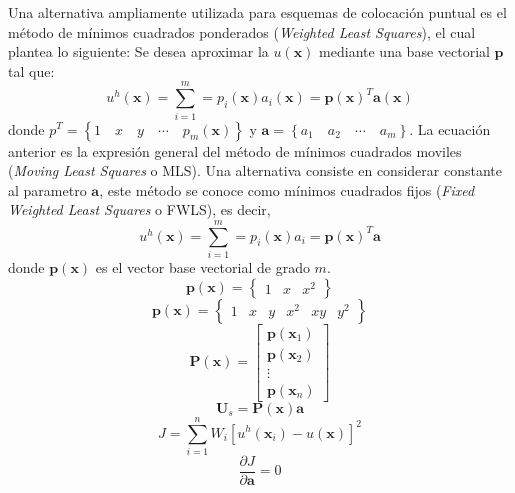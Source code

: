 Una alternativa ampliamente utilizada para esquemas de colocación puntual es el método de mínimos cuadrados ponderados (\textit{Weighted Least Squares}), el cual plantea lo siguiente: Se desea aproximar la $u(\bm{x})$ mediante una base vectorial $\bm{p}$ tal que:
\begin{equation}
    u^h(\bm{x}) = \sum_{i=1}^m = p_i(\bm{x}) a_i(\bm{x}) = \bm{p}(\bm{x})^T \bm{a}(\bm{x})
\end{equation}
donde $p^T = \left\{ 1 \quad x \quad y \quad \cdots \quad p_m(\bm{x})\right\}$ y $\bm{a} = \left\{ a_1 \quad a_2 \quad \cdots \quad a_m\right\}$. La ecuación anterior es la expresión general del método de mínimos cuadrados moviles (\textit{Moving Least Squares} o MLS). Una alternativa consiste en considerar constante al parametro $\bm{a}$, este método se conoce como mínimos cuadrados fijos (\textit{Fixed Weighted Least Squares} o FWLS), es decir,
\begin{equation}
    u^h(\bm{x}) = \sum_{i=1}^m = p_i(\bm{x}) a_i = \bm{p}(\bm{x})^T \bm{a}
\end{equation}
donde $\bm{p}(\bm{x})$ es el vector base vectorial de grado $m$.
\begin{equation}
    \bm{p}(\bm{x}) = \begin{Bmatrix} 1 & x & x^2 \end{Bmatrix}
\end{equation}
\begin{equation}
    \bm{p}(\bm{x}) = \begin{Bmatrix} 1 & x & y & x^2 & xy & y^2\end{Bmatrix}
\end{equation}
\begin{equation}
    \bm{P}(\bm{x})  = \begin{bmatrix} \bm{p}(\bm{x}_1) \\ \bm{p}(\bm{x}_2) \\ \vdots \\ \bm{p}(\bm{x}_n) \end{bmatrix}
\end{equation}
\begin{equation}
    \bm{U}_s = \bm{P}(\bm{x}) \bm{a}
\end{equation}
\begin{equation}
    J = \sum_{i=1}^n W_i \left[ u^h(\bm{x}_i) - u(\bm{x}) \right]^2
\end{equation}
\begin{equation}
    \frac{\partial J}{\partial \bm{a}} = 0
\end{equation}
